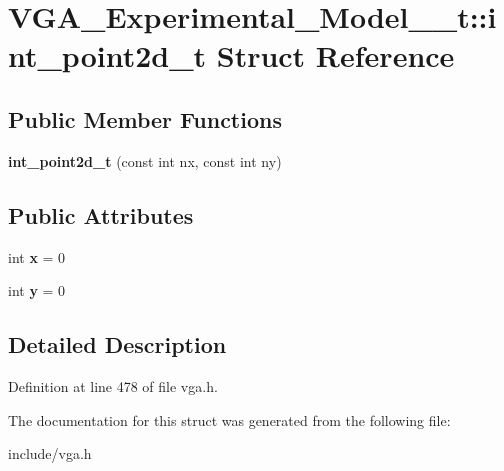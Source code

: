 \hypertarget{structVGA__Experimental__Model__1__t_1_1int__point2d__t}{\section{V\-G\-A\-\_\-\-Experimental\-\_\-\-Model\-\_\-\_\-t\-:\-:int\-\_\-point2d\-\_\-t Struct Reference}
\label{structVGA__Experimental__Model__1__t_1_1int__point2d__t}
}
\subsection*{Public Member Functions}
\begin{DoxyCompactItemize}
\item 
\hypertarget{structVGA__Experimental__Model__1__t_1_1int__point2d__t_a3dae1630e8b16fb54ff3b5c2b5faea00}{{\bfseries int\-\_\-point2d\-\_\-t} (const int nx, const int ny)}\label{structVGA__Experimental__Model__1__t_1_1int__point2d__t_a3dae1630e8b16fb54ff3b5c2b5faea00}

\end{DoxyCompactItemize}
\subsection*{Public Attributes}
\begin{DoxyCompactItemize}
\item 
\hypertarget{structVGA__Experimental__Model__1__t_1_1int__point2d__t_ad2e1a9b5388092eeecfc7cc59342c38f}{int {\bfseries x} = 0}\label{structVGA__Experimental__Model__1__t_1_1int__point2d__t_ad2e1a9b5388092eeecfc7cc59342c38f}

\item 
\hypertarget{structVGA__Experimental__Model__1__t_1_1int__point2d__t_a858656dcf71eb41f85d1e2474ee7abbe}{int {\bfseries y} = 0}\label{structVGA__Experimental__Model__1__t_1_1int__point2d__t_a858656dcf71eb41f85d1e2474ee7abbe}

\end{DoxyCompactItemize}


\subsection{Detailed Description}


Definition at line 478 of file vga.\-h.



The documentation for this struct was generated from the following file\-:\begin{DoxyCompactItemize}
\item 
include/vga.\-h\end{DoxyCompactItemize}
